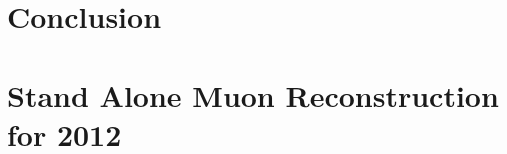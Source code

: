 \documentclass[phd,black]{PrincetonThesis}
\begin{document}
\chapter{Conclusion}
%
%
%
%
%
% 

\appendix
% 
%
\chapter{Stand Alone Muon Reconstruction for 2012}
%
\cleardoublepage 
\end{document}
